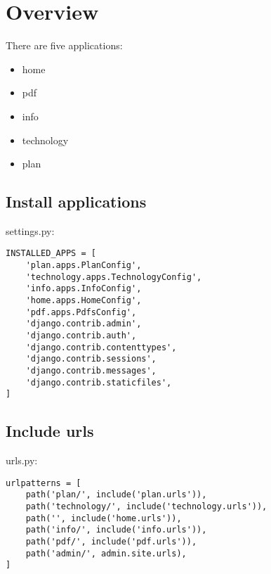 
\chapter{Overview}

There are five applications:
\begin{itemize}
\item home
\item pdf
\item info
\item technology
\item plan
\end{itemize}

\section{Install applications}

settings.py:
\lstset{language=Python}
\begin{lstlisting}
INSTALLED_APPS = [
    'plan.apps.PlanConfig',
    'technology.apps.TechnologyConfig',
    'info.apps.InfoConfig',
    'home.apps.HomeConfig',
    'pdf.apps.PdfsConfig',
    'django.contrib.admin',
    'django.contrib.auth',
    'django.contrib.contenttypes',
    'django.contrib.sessions',
    'django.contrib.messages',
    'django.contrib.staticfiles',
]
\end{lstlisting}


\section{Include urls}
urls.py:
\begin{lstlisting}
urlpatterns = [
    path('plan/', include('plan.urls')),
    path('technology/', include('technology.urls')),
    path('', include('home.urls')),
    path('info/', include('info.urls')),
    path('pdf/', include('pdf.urls')),
    path('admin/', admin.site.urls),
]
\end{lstlisting}
